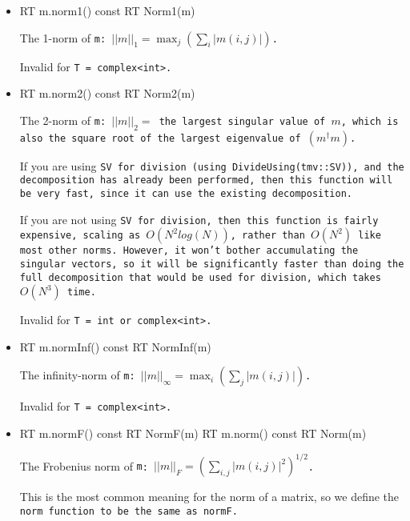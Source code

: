 \begin{itemize}

\item
\begin{tmvcode}
RT m.norm1() const
RT Norm1(m)
\end{tmvcode}
The 1-norm of \tt{m}: 
$||m||_1 = \max_j (\sum_i |m(i,j)|)$.  

Invalid for \tt{T = complex<int>}.

\item
\begin{tmvcode}
RT m.norm2() const
RT Norm2(m)
\end{tmvcode}
The 2-norm of \tt{m}: $||m||_2 =$ the largest singular value of $m$, which
is also the square root of the largest eigenvalue of $(m^\dagger m)$.  

If you are using 
\tt{SV} for division (using \tt{DivideUsing(tmv::SV)}), and the decomposition
has already been performed, then this function will be very fast, since it
can use the existing decomposition.  

If you are not using \tt{SV} for division, then this function is fairly
expensive, scaling as $O(N^2 log(N))$, rather than $O(N^2)$ like most other norms.
However, it won't bother accumulating the singular vectors, so it will 
be significantly faster than doing the full decomposition that would be
used for division, which takes $O(N^3)$ time.

Invalid for \tt{T = int} or \tt{complex<int>}.

\item
\begin{tmvcode}
RT m.normInf() const
RT NormInf(m)
\end{tmvcode}
The infinity-norm of \tt{m}: 
$||m||_\infty = \max_i (\sum_j |m(i,j)|)$.  

Invalid for \tt{T = complex<int>}.

\item
\begin{tmvcode}
RT m.normF() const
RT NormF(m)
RT m.norm() const
RT Norm(m)
\end{tmvcode}
The Frobenius norm of \tt{m}: 
$||m||_F = (\sum_{i,j} |m(i,j)|^2)^{1/2}$.  

This is the most common meaning for the norm of a matrix, so we
define the \tt{norm} function to be the same as \tt{normF}.


\end{itemize}
